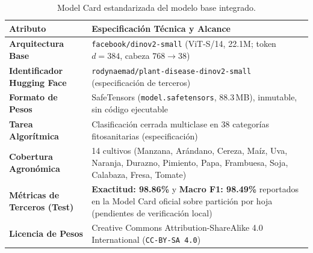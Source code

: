 \documentclass[12pt,letterpaper]{article}
\begin{document}
\begin{table}[!htbp]
\centering
\caption{Model Card estandarizada del modelo base integrado.}
\label{tab:model_card}
\footnotesize
\begin{tabularx}{\textwidth}{p{3.6cm} X}
\toprule
\textbf{Atributo} & \textbf{Especificación Técnica y Alcance} \\
\midrule
\textbf{Arquitectura Base} & \texttt{facebook/dinov2-small} (ViT-S/14, 22.1M; token $d=384$, cabeza $768 \rightarrow 38$) \cite{oquab2023dinov2} \\
\textbf{Identificador Hugging Face} & \texttt{rodynaemad/plant-disease-dinov2-small} (especificación de terceros) \cite{mohamed2024plant} \\
\textbf{Formato de Pesos} & SafeTensors (\texttt{model.safetensors}, 88.3\,MB), inmutable, sin código ejecutable \\
\textbf{Tarea Algorítmica} & Clasificación cerrada multiclase en 38 categorías fitosanitarias (especificación) \\
\textbf{Cobertura Agronómica} & 14 cultivos (Manzana, Arándano, Cereza, Maíz, Uva, Naranja, Durazno, Pimiento, Papa, Frambuesa, Soja, Calabaza, Fresa, Tomate) \\
\textbf{Métricas de Terceros (Test)} & \textbf{Exactitud: 98.86\%} y \textbf{Macro F1: 98.49\%} reportados en la Model Card oficial sobre partición por hoja (pendientes de verificación local) \cite{mohamed2024plant} \\
\textbf{Licencia de Pesos} & Creative Commons Attribution-ShareAlike 4.0 International (\texttt{CC-BY-SA 4.0}) \\
\bottomrule
\end{tabularx}
\end{table}
\end{document}
